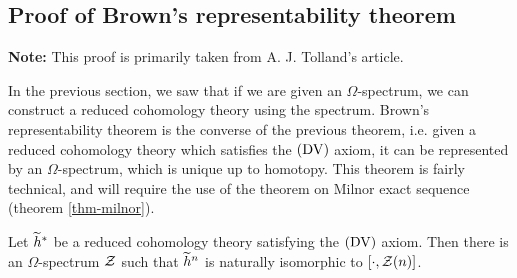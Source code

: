 
\subsection{Proof of Brown's representability theorem}
\label{sec:proof-browns-repr}

\textbf{Note:} This proof is primarily taken from A. J. Tolland's article\cite{tolland}.

In the previous section, we saw that if we are given an $\Omega$-spectrum, we can construct a
reduced cohomology theory using the spectrum. Brown's representability theorem is the converse of
the previous theorem, i.e. given a reduced cohomology theory which satisfies the $(\mathrm{DV})$ axiom, it
can be represented by an $\Omega$-spectrum, which is unique up to homotopy. This theorem is fairly
technical, and will require the use of the theorem on Milnor exact sequence (theorem
\ref{thm-milnor}).

\begin{thm}
  Let $\widetilde{h}^{\ast}$ be a reduced cohomology theory satisfying the $(\mathrm{DV})$ axiom. Then there is an
  $\Omega$-spectrum $\mathcal{Z}$ such that $\widetilde{h}^{n}$ is naturally isomorphic to
  $\left[\cdot, \mathcal{Z}(n) \right]$.
\end{thm}

